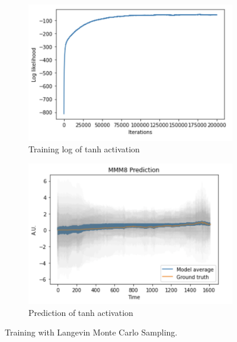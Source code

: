 \documentclass{article}
\begin{document}
\begin{figure}[h]
\begin{subfigure}[b]{0.5\textwidth}
    \end{subfigure}
    \begin{subfigure}[b]{0.5\textwidth}
        \centering
        \includegraphics[width=\textwidth]{../img/training_Langevin_200000_tanh.png}
        \caption{Training log of tanh activation}
    \end{subfigure}\hfill
    \begin{subfigure}[b]{0.5\textwidth}
        \centering
        \includegraphics[trim={0 0 0 0.7cm}, clip, width=\textwidth]{../img/prediction_Langevin_200000_tanh.png}
        \caption{Prediction of tanh activation}
    \end{subfigure}
    \caption{Training with Langevin Monte Carlo Sampling.}
\end{figure}

 
\end{document}
